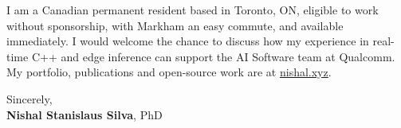 \documentclass[11pt]{article}
\newcommand{\clName}{Nishal Stanislaus Silva}
\newcommand{\clCity}{Toronto, ON}
\newcommand{\clSite}{https://nishal.xyz}
\newcommand{\clCompany}{Qualcomm}
\newcommand{\clTeam}{the AI Software team}
\begin{document}
I am a Canadian permanent resident based in \clCity{}, eligible to work without sponsorship, with Markham an easy commute, and available immediately. I would welcome the chance to discuss how my experience in real-time C++ and edge inference can support \clTeam{} at \clCompany{}. My portfolio, publications and open-source work are at \href{\clSite}{nishal.xyz}.

\vspace{12pt}
Sincerely,\\[2pt]
\textbf{\clName}, PhD
\end{document}
